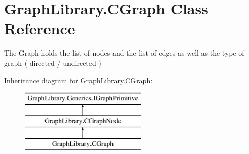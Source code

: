\hypertarget{class_graph_library_1_1_c_graph}{}\section{Graph\+Library.\+C\+Graph Class Reference}
\label{class_graph_library_1_1_c_graph}


The Graph holds the list of nodes and the list of edges as well as the type of graph ( directed / undirected )  


Inheritance diagram for Graph\+Library.\+C\+Graph\+:\begin{figure}[H]
\begin{center}
\leavevmode
\includegraphics[height=3.000000cm]{class_graph_library_1_1_c_graph}
\end{center}
\end{figure}
